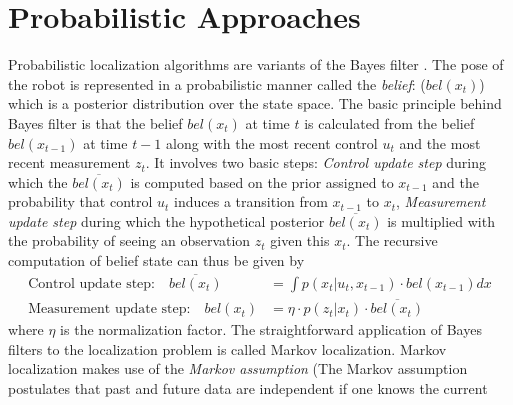 \section{Probabilistic Approaches}
\label{ssec:prob_approaches}
	Probabilistic localization algorithms are variants of the Bayes filter \cite{thrun2005probabilistic}. The pose of the robot is represented in a probabilistic manner called the \emph{belief}: ($bel(x_t)$) which is a posterior distribution over the state space. The basic principle behind Bayes filter is that the belief $bel(x_t)$ at time $t$ is calculated from the belief $bel(x_{t-1})$ at time $t-1$ along with the most recent control $u_t$ and the most recent measurement $z_t$. It involves two basic steps: \emph{Control update step} during which the $\overline{bel(x_t)}$ is computed based on the prior assigned to $x_{t-1}$ and the probability that control $u_t$ induces a transition from $x_{t-1}$ to $x_t$, \emph{Measurement update step} during which the hypothetical posterior $\overline{bel(x_t)}$ is multiplied with the probability of seeing an observation $z_t$ given this $x_t$. The recursive computation of belief state can thus be given by
	\begin{align*}
	\text{Control update step:}\quad \overline{bel(x_t)} &= \int p(x_t\vert u_t,x_{t-1})\cdot bel(x_{t-1}) dx \\
	\text{Measurement update step:}\quad {bel(x_t)} &= \eta\cdot p(z_t\vert x_{t})\cdot \overline{bel(x_t)}
	\end{align*}
	where $\eta$ is the normalization factor.
	The straightforward application of Bayes filters to the localization problem is called Markov localization. Markov localization makes use of the \emph{Markov assumption} (The Markov
assumption postulates that past and future data are independent if one knows the current
